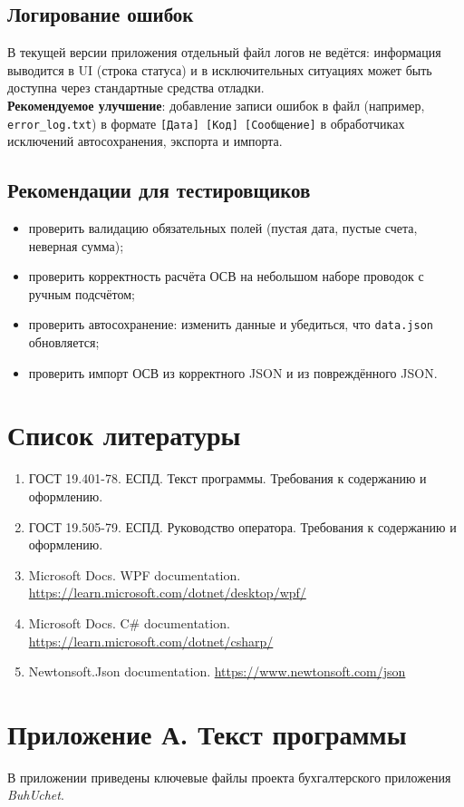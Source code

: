 \documentclass[14pt,a4paper]{extarticle}
\begin{document}
\subsection{Логирование ошибок}
В текущей версии приложения отдельный файл логов не ведётся: информация выводится в UI (строка статуса) и в исключительных ситуациях может быть доступна через стандартные средства отладки.\\
\textbf{Рекомендуемое улучшение}: добавление записи ошибок в файл (например, \texttt{error\_log.txt}) в формате \texttt{[Дата] [Код] [Сообщение]} в обработчиках исключений автосохранения, экспорта и импорта.

\subsection{Рекомендации для тестировщиков}
\begin{itemize}
    \item проверить валидацию обязательных полей (пустая дата, пустые счета, неверная сумма);
    \item проверить корректность расчёта ОСВ на небольшом наборе проводок с ручным подсчётом;
    \item проверить автосохранение: изменить данные и убедиться, что \texttt{data.json} обновляется;
    \item проверить импорт ОСВ из корректного JSON и из повреждённого JSON.
\end{itemize}

\section{Список литературы}
\begin{enumerate}
    \item ГОСТ 19.401-78. ЕСПД. Текст программы. Требования к содержанию и оформлению.
    \item ГОСТ 19.505-79. ЕСПД. Руководство оператора. Требования к содержанию и оформлению.
    \item Microsoft Docs. WPF documentation. \url{https://learn.microsoft.com/dotnet/desktop/wpf/}
    \item Microsoft Docs. C\# documentation. \url{https://learn.microsoft.com/dotnet/csharp/}
    \item Newtonsoft.Json documentation. \url{https://www.newtonsoft.com/json}
\end{enumerate}

\newpage
\appendix
\section{Приложение А. Текст программы}
В приложении приведены ключевые файлы проекта бухгалтерского приложения \textit{BuhUchet}.
\end{document}
